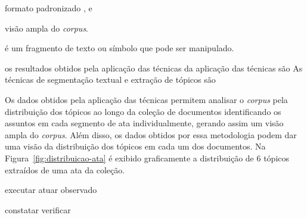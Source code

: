 formato padronizado , e  


visão ampla do \textit{corpus}. 


é um fragmento de texto ou símbolo que pode ser manipulado. 











os resultados obtidos pela aplicação das técnicas
da aplicação das técnicas são 
As técnicas de segmentação textual e extração de tópicos são 






Os dados obtidos pela aplicação das técnicas permitem analisar o \textit{corpus} pela distribuição dos tópicos ao longo da coleção de documentos identificando os assuntos em cada segmento de ata individualmente, gerando assim um visão ampla do \textit{corpus}. Além disso, os dados obtidos por essa metodologia podem dar uma visão da distribuição dos tópicos em cada um dos documentos. Na Figura~\ref{fig:distribuicao-ata} é exibido graficamente a distribuição de 6 tópicos extraídos de uma ata da coleção. 











executar
atuar
observado

constatar
verificar


































